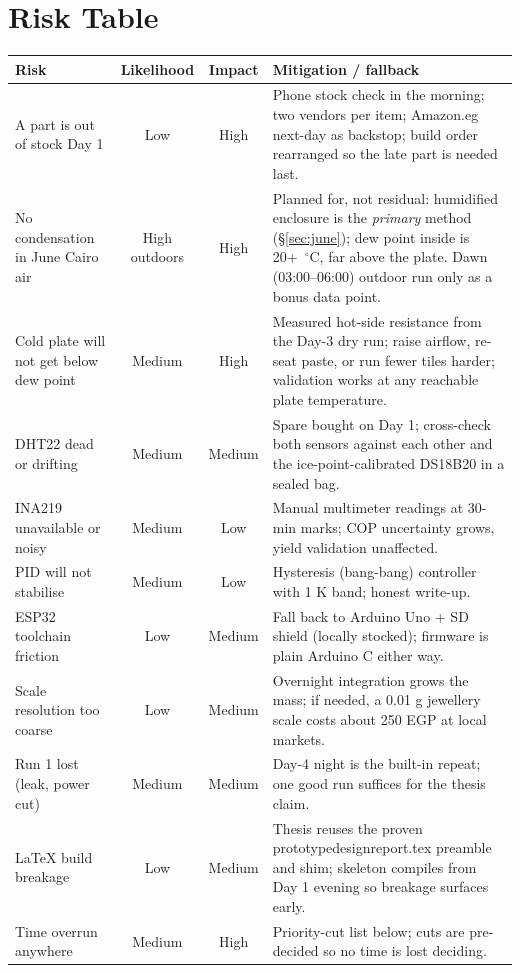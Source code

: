 \documentclass[11pt,a4paper]{article}
\newcommand{\f}[1]{{\ttfamily\def\_{\textunderscore\allowbreak}#1}}
\begin{document}
\section{Risk Table}
\begin{center}
\small
\renewcommand{\arraystretch}{1.25}
\begin{longtable}{@{}p{3.6cm}ccp{7.0cm}@{}}
\toprule
\textbf{Risk} & \textbf{Likelihood} & \textbf{Impact} & \textbf{Mitigation / fallback} \\
\midrule
\endhead
A part is out of stock Day 1 & Low & High & Phone stock check in the morning; two vendors per item; Amazon.eg next-day as backstop; build order rearranged so the late part is needed last. \\
No condensation in June Cairo air & High outdoors & High & Planned for, not residual: humidified enclosure is the \emph{primary} method (\S\ref{sec:june}); dew point inside is 20+~$^{\circ}$C, far above the plate. Dawn (03:00--06:00) outdoor run only as a bonus data point. \\
Cold plate will not get below dew point & Medium & High & Measured hot-side resistance from the Day-3 dry run; raise airflow, re-seat paste, or run fewer tiles harder; validation works at any reachable plate temperature. \\
DHT22 dead or drifting & Medium & Medium & Spare bought on Day 1; cross-check both sensors against each other and the ice-point-calibrated DS18B20 in a sealed bag. \\
INA219 unavailable or noisy & Medium & Low & Manual multimeter readings at 30-min marks; COP uncertainty grows, yield validation unaffected. \\
PID will not stabilise & Medium & Low & Hysteresis (bang-bang) controller with 1 K band; honest write-up. \\
ESP32 toolchain friction & Low & Medium & Fall back to Arduino Uno + SD shield (locally stocked); firmware is plain Arduino C either way. \\
Scale resolution too coarse & Low & Medium & Overnight integration grows the mass; if needed, a 0.01 g jewellery scale costs about 250 EGP at local markets. \\
Run 1 lost (leak, power cut) & Medium & Medium & Day-4 night is the built-in repeat; one good run suffices for the thesis claim. \\
LaTeX build breakage & Low & Medium & Thesis reuses the proven \f{prototype\_design\_report.tex} preamble and shim; skeleton compiles from Day 1 evening so breakage surfaces early. \\
Time overrun anywhere & Medium & High & Priority-cut list below; cuts are pre-decided so no time is lost deciding. \\
\bottomrule
\end{longtable}
\end{center}
\end{document}
